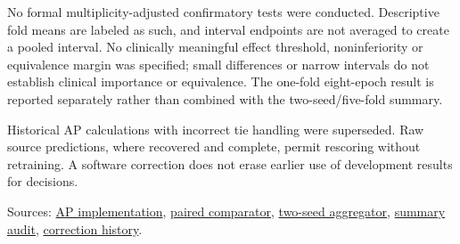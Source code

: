 \documentclass[11pt,a4paper]{article}
\begin{document}
No formal multiplicity-adjusted confirmatory tests were conducted. Descriptive fold means are labeled as such, and interval endpoints are not averaged to create a pooled interval. No clinically meaningful effect threshold, noninferiority or equivalence margin was specified; small differences or narrow intervals do not establish clinical importance or equivalence. The one-fold eight-epoch result is reported separately rather than combined with the two-seed/five-fold summary.

Historical AP calculations with incorrect tie handling were superseded. Raw source predictions, where recovered and complete, permit rescoring without retraining. A software correction does not erase earlier use of development results for decisions.

Sources: \href{../src/t1d_tkg/metrics.py}{AP implementation}, \href{../scripts/compare_loop_pilot_archives.py}{paired comparator}, \href{../scripts/summarize_two_seed_graph_aligned_control.py}{two-seed aggregator}, \href{../audit/loop_graph_vs_aligned_nongraph_two_seed_five_fold_participant_summary.json}{summary audit}, \href{../docs/corrected_pilot_recovery.md}{correction history}.
\end{document}
